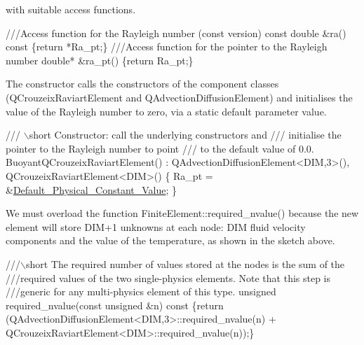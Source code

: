 with suitable access functions.

 
\begin{DoxyCodeInclude}
 \textcolor{comment}{///Access function for the Rayleigh number (const version)}
 \textcolor{keyword}{const} \textcolor{keywordtype}{double} &ra()\textcolor{keyword}{ const }\{\textcolor{keywordflow}{return} *Ra\_pt;\}
\textcolor{comment}{}
\textcolor{comment}{ ///Access function for the pointer to the Rayleigh number}
\textcolor{comment}{} \textcolor{keywordtype}{double}* &ra\_pt() \{\textcolor{keywordflow}{return} Ra\_pt;\}

\end{DoxyCodeInclude}


The constructor calls the constructors of the component classes ({\ttfamily Q\+Crouzeix\+Raviart\+Element} and {\ttfamily Q\+Advection\+Diffusion\+Element}) and initialises the value of the Rayleigh number to zero, via a static default parameter value.

 
\begin{DoxyCodeInclude}
 \textcolor{comment}{/// \(\backslash\)short Constructor: call the underlying constructors and }
\textcolor{comment}{ /// initialise the pointer to the Rayleigh number to point}
\textcolor{comment}{}\textcolor{comment}{ /// to the default value of 0.0.}
\textcolor{comment}{} BuoyantQCrouzeixRaviartElement() : QAdvectionDiffusionElement<DIM,3>(),
                                   QCrouzeixRaviartElement<DIM>() 
  \{
   Ra\_pt = &\hyperlink{namespaceoomph_1_1MultiDomainBoussinesqHelper_ae77c07b69cffe295ac07e2c25c31a8aa}{Default\_Physical\_Constant\_Value};
  \}

\end{DoxyCodeInclude}


We must overload the function {\ttfamily Finite\+Element\+::required\+\_\+nvalue()} because the new element will store {\ttfamily D\+I\+M+1} unknowns at each node\+: {\ttfamily D\+IM} fluid velocity components and the value of the temperature, as shown in the sketch above.

 
\begin{DoxyCodeInclude}
 \textcolor{comment}{///\(\backslash\)short The required number of values stored at the nodes is the sum of the}
\textcolor{comment}{ ///required values of the two single-physics  elements. Note that this step is}
\textcolor{comment}{}\textcolor{comment}{ ///generic for any multi-physics element of this type.}
\textcolor{comment}{} \textcolor{keywordtype}{unsigned} required\_nvalue(\textcolor{keyword}{const} \textcolor{keywordtype}{unsigned} &n)\textcolor{keyword}{ const}
\textcolor{keyword}{  }\{\textcolor{keywordflow}{return} (QAdvectionDiffusionElement<DIM,3>::required\_nvalue(n) +
           QCrouzeixRaviartElement<DIM>::required\_nvalue(n));\}

\end{DoxyCodeInclude}


